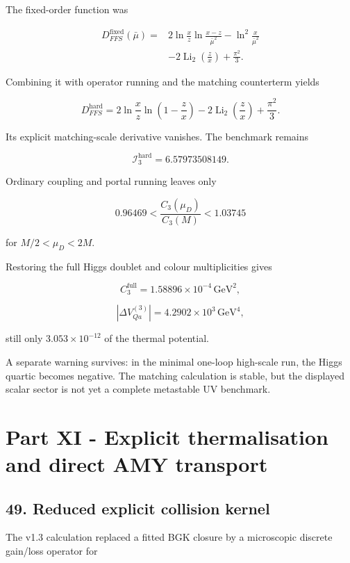 \documentclass[
]{article}
\begin{document}
The fixed-order function was

\[
\begin{aligned}
D_{FFS}^{\mathrm{fixed}}(\bar\mu)
={}&2\ln\frac xz\ln\frac{x-z}{\bar\mu^2}
-\ln^2\frac{x}{\bar\mu^2}\\
&-2\operatorname{Li}_2\left(\frac zx\right)
+\frac{\pi^2}{3}.
\end{aligned}
\]

Combining it with operator running and the matching counterterm yields

\[
\boxed{
D_{FFS}^{\mathrm{hard}}
=2\ln\frac xz\ln\left(1-\frac zx\right)
-2\operatorname{Li}_2\left(\frac zx\right)
+\frac{\pi^2}{3}.
}
\]

Its explicit matching-scale derivative vanishes. The benchmark remains

\[
\mathcal I_3^{\mathrm{hard}}=6.57973508149.
\]

Ordinary coupling and portal running leaves only

\[
0.96469<\frac{C_3(\mu_D)}{C_3(M)}<1.03745
\]

for \(M/2<\mu_D<2M\).

Restoring the full Higgs doublet and colour multiplicities gives

\[
C_3^{\mathrm{full}}=1.58896\times10^{-4}\,\mathrm{GeV}^2,
\]

\[
|\Delta V_{Qa}^{(3)}|
=4.2902\times10^3\,\mathrm{GeV}^4,
\]

still only \(3.053\times10^{-12}\) of the thermal potential.

A separate warning survives: in the minimal one-loop high-scale run, the
Higgs quartic becomes negative. The matching calculation is stable, but
the displayed scalar sector is not yet a complete metastable UV
benchmark.

\section{Part XI - Explicit thermalisation and direct AMY
transport}\label{part-xi---explicit-thermalisation-and-direct-amy-transport}

\subsection{49. Reduced explicit collision
kernel}\label{reduced-explicit-collision-kernel}

The v1.3 calculation replaced a fitted BGK closure by a microscopic
discrete gain/loss operator for
\end{document}
